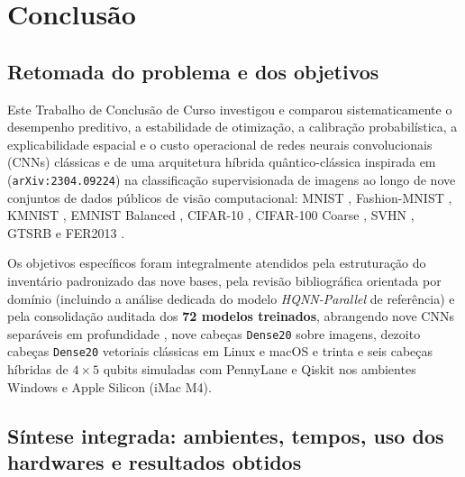 \documentclass[
    12pt,
    openright,
    oneside,
    a4paper,
    english,
    brazil
]{abntex2}
\begin{document}
\chapter{Conclusão}
\label{cap:conclusao}

\section{Retomada do problema e dos objetivos}

Este Trabalho de Conclusão de Curso investigou e comparou sistematicamente o desempenho preditivo, a estabilidade de otimização, a calibração probabilística, a explicabilidade espacial e o custo operacional de redes neurais convolucionais (CNNs) clássicas e de uma arquitetura híbrida quântico-clássica inspirada em  (\texttt{arXiv:2304.09224}) na classificação supervisionada de imagens ao longo de nove conjuntos de dados públicos de visão computacional: MNIST \cite{lecun1998gradient}, Fashion-MNIST \cite{xiao2017fashionmnist}, KMNIST \cite{clanuwat2018kmnist}, EMNIST Balanced \cite{cohen2017emnist}, CIFAR-10 \cite{krizhevsky2009learning}, CIFAR-100 Coarse \cite{krizhevsky2009learning}, SVHN \cite{netzer2011svhn}, GTSRB \cite{stallkamp2012gtsrb} e FER2013 \cite{goodfellow2013fer2013}.

Os objetivos específicos foram integralmente atendidos pela estruturação do inventário padronizado das nove bases, pela revisão bibliográfica orientada por domínio (incluindo a análise dedicada do modelo \textit{HQNN-Parallel} de referência) e pela consolidação auditada dos \textbf{72 modelos treinados}, abrangendo nove CNNs separáveis em profundidade \cite{chollet2017xception,wu2018groupnorm}, nove cabeças \texttt{Dense20} sobre imagens, dezoito cabeças \texttt{Dense20} vetoriais clássicas em Linux e macOS e trinta e seis cabeças híbridas de \(4 \times 5\) qubits simuladas com PennyLane \cite{bergholm2018pennylane} e Qiskit \cite{javadiabhari2024qiskit} nos ambientes Windows e Apple Silicon (iMac M4).

\section{Síntese integrada: ambientes, tempos, uso dos hardwares e resultados obtidos}
\end{document}
